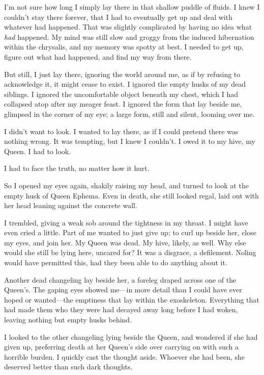 I’m not sure how long I simply lay there in that shallow puddle of fluids. I knew I couldn’t stay there forever, that I had to eventually get up and deal with whatever had happened. That was slightly complicated by having no idea what \textit{had} happened. My mind was still slow and groggy from the induced hibernation within the chrysalis, and my memory was spotty at best. I needed to get up, figure out what had happened, and find my way from there.

But still, I just lay there, ignoring the world around me, as if by refusing to acknowledge it, it might cease to exist. I ignored the empty husks of my dead siblings. I ignored the uncomfortable object beneath my chest, which I had collapsed atop after my meager feast. I ignored the form that lay beside me, glimpsed in the corner of my eye; a large form, still and silent, looming over me.

I didn’t want to look. I wanted to lay there, as if I could pretend there was nothing wrong. It was tempting, but I knew I couldn’t. I owed it to my hive, my Queen. I had to look.

I had to face the truth, no matter how it hurt.

So I opened my eyes again, shakily raising my head, and turned to look at the empty husk of Queen Ephema. Even in death, she still looked regal, laid out with her head leaning against the concrete wall.

I trembled, giving a weak sob around the tightness in my throat. I might have even cried a little. Part of me wanted to just give up; to curl up beside her, close my eyes, and join her. My Queen was dead. My hive, likely, as well. Why else would she still be lying here, uncared for? It was a disgrace, a defilement. Noling would have permitted this, had they been able to do anything about it.

Another dead changeling lay beside her, a foreleg draped across one of the Queen’s. The gaping eyes showed me—in more detail than I could have ever hoped or wanted—the emptiness that lay within the exoskeleton. Everything that had made them who they were had decayed away long before I had woken, leaving nothing but empty husks behind.

I looked to the other changeling lying beside the Queen, and wondered if she had given up, preferring death at her Queen’s side over carrying on with such a horrible burden. I quickly cast the thought aside. Whoever she had been, she deserved better than such dark thoughts.

